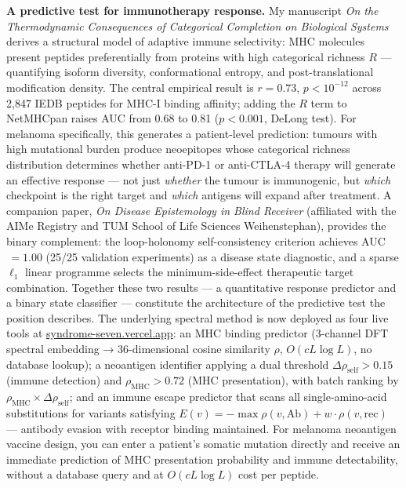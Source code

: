 \documentclass[12pt,a4paper]{article}
\begin{document}
\textbf{A predictive test for immunotherapy response.}
My manuscript \textit{On the Thermodynamic Consequences of Categorical Completion
on Biological Systems} derives a structural model of adaptive immune selectivity:
MHC molecules present peptides preferentially from proteins with high categorical
richness $R$ --- quantifying isoform diversity, conformational entropy, and
post-translational modification density. The central empirical result is
$r = 0.73$, $p < 10^{-12}$ across 2,847 IEDB peptides for MHC-I binding
affinity; adding the $R$ term to NetMHCpan raises AUC from 0.68 to 0.81
($p < 0.001$, DeLong test). For melanoma specifically, this generates a
patient-level prediction: tumours with high mutational burden produce neoepitopes
whose categorical richness distribution determines whether anti-PD-1 or
anti-CTLA-4 therapy will generate an effective response --- not just
\textit{whether} the tumour is immunogenic, but \textit{which} checkpoint
is the right target and \textit{which} antigens will expand after treatment.
A companion paper, \textit{On Disease Epistemology in Blind Receiver} (affiliated
with the AIMe Registry and TUM School of Life Sciences Weihenstephan), provides
the binary complement: the loop-holonomy self-consistency criterion achieves
AUC$\,=1.00$ (25/25 validation experiments) as a disease state diagnostic, and
a sparse $\ell_1$ linear programme selects the minimum-side-effect therapeutic
target combination. Together these two results --- a quantitative response
predictor and a binary state classifier --- constitute the architecture of the
predictive test the position describes.
The underlying spectral method is now deployed as four live tools at
\href{https://syndrome-seven.vercel.app}{syndrome-seven.vercel.app}:
an MHC binding predictor (3-channel DFT spectral embedding → 36-dimensional
cosine similarity $\rho$, $O(cL\log L)$, no database lookup);
a neoantigen identifier applying a dual threshold
$\Delta\rho_\text{self} > 0.15$ (immune detection) and $\rho_\text{MHC} > 0.72$
(MHC presentation), with batch ranking by $\rho_\text{MHC} \times \Delta\rho_\text{self}$;
and an immune escape predictor that scans all single-amino-acid substitutions
for variants satisfying $E(v) = -\max\rho(v,\mathrm{Ab}) + w\cdot\rho(v,\mathrm{rec})$
--- antibody evasion with receptor binding maintained.
For melanoma neoantigen vaccine design, you can enter a patient's somatic
mutation directly and receive an immediate prediction of MHC presentation
probability and immune detectability, without a database query and at
$O(cL\log L)$ cost per peptide.
\end{document}

